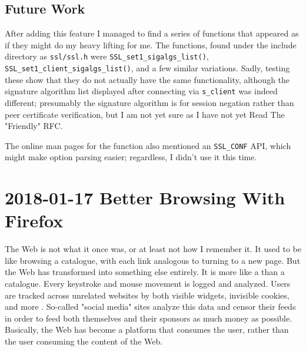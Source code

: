 \documentclass{article}
\begin{document}
\subsection{Future Work}
After adding this feature I managed to find a series of functions that appeared as if they might do my heavy lifting for me.  The functions, found under the include directory as \texttt{ssl/ssl.h} were \texttt{SSL_set1_sigalgs_list()}, \texttt{SSL_set1_client_sigalgs_list()}, and a few similar variations.  Sadly, testing these show that they do not actually have the same functionality, although the signature algorithm list displayed after connecting via \texttt{s_client} was indeed different; presumably the signature algorithm is for session negation rather than peer certificate verification, but I am not yet sure as I have not yet Read The "Friendly"  RFC.

The online man pages for the function also mentioned an \texttt{SSL_CONF} API, which might make option parsing easier; regardless, I didn't use it this time.


\section{2018-01-17 Better Browsing With Firefox}
The Web is not what it once was, or at least not how I remember it.  It used to be like browsing a catalogue, with each link analogous to turning to a new page.  But the Web has transformed into something else entirely.  It is more like a  than a catalogue.  Every keystroke and mouse movement is logged and analyzed.  Users are tracked across unrelated websites by both visible widgets, invisible cookies, and more .  So-called "social media" sites analyze this data and censor their feeds in order to feed both themselves and their sponsors as much money as possible.  Basically, the Web has become a platform that consumes the user, rather than the user consuming the content of the Web.
\end{document}
